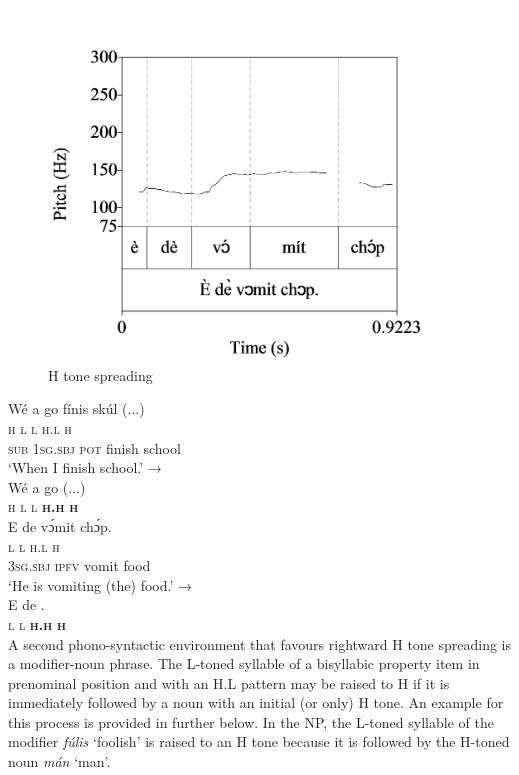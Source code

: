 \begin{figure}
\caption{H tone spreading}
\label{fig:key:3.13}
\includegraphics[height=.3\textheight]{figures/yakpomod-img15.png} 
\end{figure}

\ea\label{ex:key:51}
\glll Wé  a    go  fínis    skúl  (...)\\
\textsc{h}  \textsc{l}    \textsc{l}  \textsc{h.l}    \textsc{h}\\
\textsc{sub}  \textsc{1sg.sbj}  \textsc{pot}  finish  school\\
\glt  ‘When I finish school.’  →\\
\gll    Wé  a  go      (...)\\
\textsc{h}  \textsc{l}  \textsc{l}  \textbf{\textsc{h.h}}    \textbf{\textsc{h}}\\
\z
\ea\label{ex:key:52}   
\glll E    de    vɔ́mit  chɔ́p.\\
\textsc{l}    \textsc{l}    \textsc{h.l}    \textsc{h}\\
\textsc{3sg.sbj}  \textsc{ipfv}    vomit  food\\
\glt  ‘He is vomiting (the) food.’  →\\
\gll E  de    .\\
\textsc{l}  \textsc{l}  \textbf{\textsc{h.h}  }  \textbf{\textsc{h}}\\
\z
A second phono-syntactic environment that favours rightward H tone spreading is a modifier-noun phrase. The L-toned syllable of a bisyllabic property item in prenominal position and with an H.L pattern may be raised to H if it is immediately followed by a noun with an initial (or only) H tone. An example for this process is provided in  further below. In the NP, the L-toned syllable of the modifier \textit{fúlis} ‘foolish’ is raised to an H tone because it is followed by the H-toned noun \textit{mán} ‘man’.


